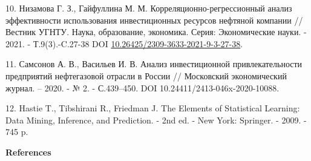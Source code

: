 \begin{refs}
10. Низамова Г. З., Гайфуллина М. М. Корреляционно-регрессионный анализ
эффективности использования инвестиционных ресурсов нефтяной компании //
Вестник УГНТУ. Наука, образование, экономика. Серия: Экономические
науки. - 2021. - Т.9(3).-C.27-38 DOI
\href{https://doi.org/10.26425/2309-3633-2021-9-3-27-38}{10.26425/2309-3633-2021-9-3-27-38}.

11. Самсонов А. В., Васильев И. В. Анализ инвестиционной
привлекательности предприятий нефтегазовой отрасли в России //
Московский экономический журнал. -- 2020. - № 2. - С.439--450. DOI
10.24411/2413-046x-2020-10088.

12. Hastie T., Tibshirani R., Friedman J. The Elements of Statistical
Learning: Data Mining, Inference, and Prediction. - 2nd ed. - New York:
Springer. - 2009. - 745 p.
\end{refs}

\begin{center}
{\bfseries References}
\end{center}

